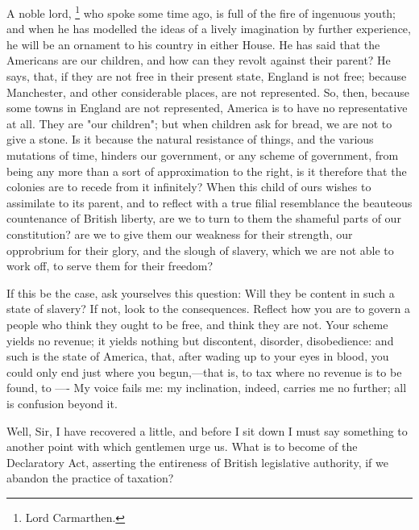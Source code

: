 A noble lord,
\footnote{Lord Carmarthen.}
who spoke some time ago, is full of the fire of ingenuous youth; and when he has modelled the ideas of a lively imagination by further experience, he will be an ornament to his country in either House. He has said that the Americans are our children, and how can they revolt against their parent? He says, that, if they are not free in their present state, England is not free; because Manchester, and other considerable places, are not represented. So, then, because some towns in England are not represented, America is to have no representative at all. They are "our children"; but when children ask for bread, we are not to give a stone. Is it because the natural resistance of things, and the various mutations of time, hinders our government, or any scheme of government, from being any more than a sort of approximation to the right, is it therefore that the colonies are to recede from it infinitely? When this child of ours wishes to assimilate to its parent, and to reflect with a true filial resemblance the beauteous countenance of British liberty, are we to turn to them the shameful parts of our constitution? are we to give them our weakness for their strength, our opprobrium for their glory, and the slough of slavery, which we are not able to work off, to serve them for their freedom?

If this be the case, ask yourselves this question: Will they be content in such a state of slavery? If not, look to the consequences. Reflect how you are to govern a people who think they ought to be free, and think they are not. Your scheme yields no revenue; it yields nothing but discontent, disorder, disobedience: and such is the state of America, that, after wading up to your eyes in blood, you could only end just where you begun,—that is, to tax where no revenue is to be found, to ---- My voice fails me: my inclination, indeed, carries me no further; all is confusion beyond it.

Well, Sir, I have recovered a little, and before I sit down I must say something to another point with which gentlemen urge us. What is to become of the Declaratory Act, asserting the entireness of British legislative authority, if we abandon the practice of taxation?

